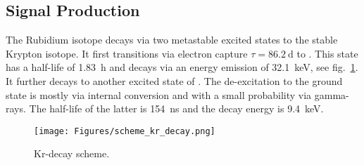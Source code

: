 
\FloatBarrier
\subsection{ Signal Production}
\label{ssec:source}
\FloatBarrier


The Rubidium isotope  decays via two metastable excited states to the stable  Krypton isotope.
It first transitions via electron capture $ \tau = \SI{86.2}{\day} $ to .
This state has a half-life of \SI{1.83}{\hour} and decays via an energy emission of \SI{32.1}{\kilo\electronvolt}, see fig.~\ref{fig:scheme_kr}.
It further decays to another excited state of .
The de-excitation to the  ground state is mostly via internal conversion and with a small probability via gamma-rays.
The half-life of the latter is \SI{154}{\nano\s} and the decay energy is \SI{9.4}{\kilo\electronvolt}.


\begin{figure}
    \centering
    \texttt{[image: Figures/scheme\_kr\_decay.png]}  %
    \caption[Decay Scheme Krypton]{
        Kr-decay scheme\cite{kr_scheme}.
    }
    \label{fig:scheme_kr}
\end{figure}

